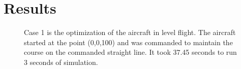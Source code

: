 \documentclass[letterpaper, 10 pt, conference]{ieeeconf}  %
\begin{document}


\section{Results}


\begin{figure}[htbp]
	\centering
	\qquad
	\caption{Case 1 is the optimization of the aircraft in level flight. The aircraft started at the point (0,0,100) and was commanded to maintain the course on the commanded straight line. It took 37.45 seconds to run 3 seconds of simulation.}
	\label{fig:fw_level}
\end{figure}
\end{document}
